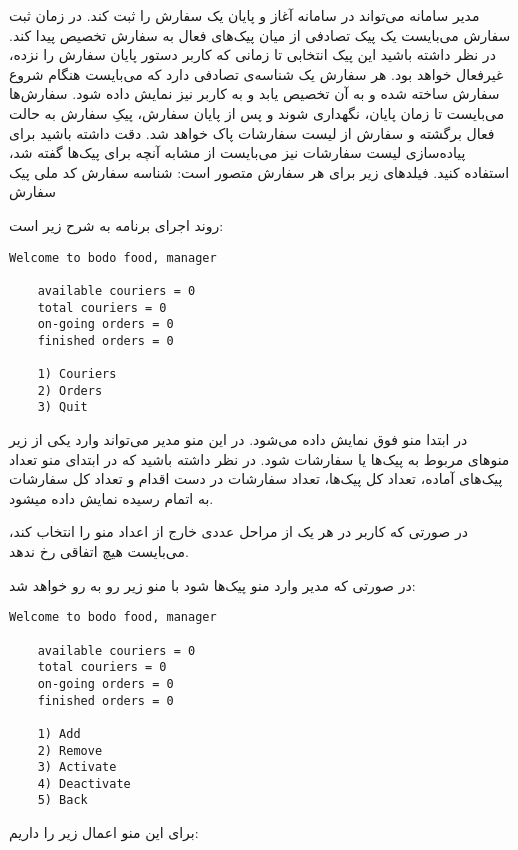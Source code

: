 \documentclass[../main.tex]{subfiles}
\begin{document}

مدیر سامانه می‌تواند در سامانه آغاز و پایان یک سفارش را ثبت کند. در زمان ثبت سفارش می‌بایست یک پیک تصادفی از میان پیک‌های فعال به سفارش تخصیص پیدا کند. در نظر داشته باشید این پیک انتخابی تا زمانی که کاربر دستور پایان سفارش را نزده، غیرفعال خواهد بود.
هر سفارش یک شناسه‌ی تصادفی دارد که می‌بایست هنگام شروع سفارش ساخته شده و به آن تخصیص یابد و به کاربر نیز نمایش داده شود. سفارش‌ها می‌بایست تا زمان پایان، نگهداری شوند و پس از پایان سفارش، پیکِ سفارش به حالت فعال برگشته و سفارش از لیست سفارشات پاک خواهد شد. دقت داشته باشید برای پیاده‌سازی لیست سفارشات نیز می‌بایست از مشابه آنچه برای پیک‌ها گفته شد، استفاده کنید.
فیلدهای زیر برای هر سفارش متصور است:
 شناسه سفارش
 کد ملی پیک سفارش


روند اجرای برنامه به شرح زیر است:

\begin{latin}
\begin{lstlisting}[]
    Welcome to bodo food, manager

    available couriers = 0
    total couriers = 0
    on-going orders = 0
    finished orders = 0

    1) Couriers
    2) Orders
    3) Quit
\end{lstlisting}
\end{latin}

در ابتدا منو فوق نمایش داده می‌شود. در این منو مدیر می‌تواند وارد یکی از زیر منوهای مربوط به پیک‌ها یا سفارشات شود.
در نظر داشته باشید که در ابتدای منو تعداد پیک‌های آماده، تعداد کل پیک‌ها، تعداد سفارشات در دست اقدام و تعداد کل سفارشات به اتمام رسیده نمایش داده میشود.

در صورتی که کاربر در هر یک از مراحل عددی خارج از اعداد منو را انتخاب کند، می‌بایست هیچ اتفاقی رخ ندهد.

در صورتی که مدیر وارد منو پیک‌ها شود با منو زیر رو به رو خواهد شد:


\begin{latin}
\begin{lstlisting}[]
    Welcome to bodo food, manager

    available couriers = 0
    total couriers = 0
    on-going orders = 0
    finished orders = 0

    1) Add
    2) Remove
    3) Activate
    4) Deactivate
    5) Back
\end{lstlisting}
\end{latin}

برای این منو اعمال زیر را داریم:
\end{document}
